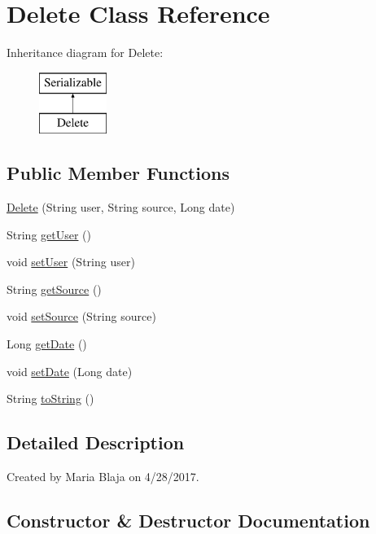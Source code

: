 \hypertarget{class_delete}{}\section{Delete Class Reference}
\label{class_delete}
Inheritance diagram for Delete\+:\begin{figure}[H]
\begin{center}
\leavevmode
\includegraphics[height=2.000000cm]{class_delete}
\end{center}
\end{figure}
\subsection*{Public Member Functions}
\begin{DoxyCompactItemize}
\item 
\hyperlink{class_delete_acb6bc707d28650bdeb2283f87630e0b6}{Delete} (String user, String source, Long date)
\item 
String \hyperlink{class_delete_a127124607f6d882f87a4deabc2a95e33}{get\+User} ()
\item 
void \hyperlink{class_delete_a1154a1eb8b05320cf686691cd727dc50}{set\+User} (String user)
\item 
String \hyperlink{class_delete_acc45fccf90716ebcd88990f0c6c36d43}{get\+Source} ()
\item 
void \hyperlink{class_delete_a2bddae4762dd4231ab53ee8b2409130b}{set\+Source} (String source)
\item 
Long \hyperlink{class_delete_a65c0b139726126a7c0a0bfef168bbe84}{get\+Date} ()
\item 
void \hyperlink{class_delete_ae1062b901bae5ee6d6722448a12af7aa}{set\+Date} (Long date)
\item 
String \hyperlink{class_delete_ab39433411917f38404d915307d826600}{to\+String} ()
\end{DoxyCompactItemize}


\subsection{Detailed Description}
Created by Maria Blaja on 4/28/2017. 

\subsection{Constructor \& Destructor Documentation}
\mbox{\label{class_delete_acb6bc707d28650bdeb2283f87630e0b6}} 
